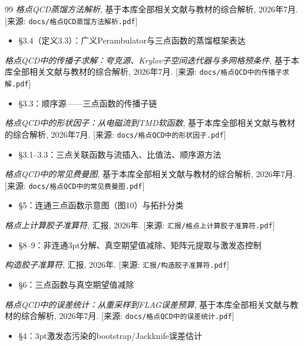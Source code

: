 \documentclass[12pt,a4paper]{ctexart}
\theoremstyle{definition}
\begin{document}
\begin{thebibliography}{99}
\textit{格点QCD蒸馏方法解析},
基于本库全部相关文献与教材的综合解析, 2026年7月.
[来源: \texttt{docs/格点QCD蒸馏方法解析.pdf}]
\begin{itemize}
    \item §3.4（定义3.3）：广义Perambulator与三点函数的蒸馏框架表达
\end{itemize}

\textit{格点QCD中的传播子求解：夸克源、Krylov子空间迭代器与多网格预条件},
基于本库全部相关文献与教材的综合解析, 2026年7月.
[来源: \texttt{docs/格点QCD中的传播子求解.pdf}]
\begin{itemize}
    \item §3.3：顺序源——三点函数的传播子链
\end{itemize}

\textit{格点QCD中的形状因子：从电磁流到TMD软函数},
基于本库全部相关文献与教材的综合解析, 2026年7月.
[来源: \texttt{docs/格点QCD中的形状因子.pdf}]
\begin{itemize}
    \item §3.1--3.3：三点关联函数与流插入、比值法、顺序源方法
\end{itemize}

\textit{格点QCD中的常见费曼图},
基于本库全部相关文献与教材的综合解析, 2026年7月.
[来源: \texttt{docs/格点QCD中的常见费曼图.pdf}]
\begin{itemize}
    \item §5：连通三点函数示意图（图10）与拓扑分类
\end{itemize}

\textit{格点上计算胶子准算符},
汇报, 2026年.
[来源: \texttt{汇报/格点上计算胶子准算符.pdf}]
\begin{itemize}
    \item §8--9：非连通3pt分解、真空期望值减除、矩阵元提取与激发态控制
\end{itemize}

\textit{构造胶子准算符},
汇报, 2026年.
[来源: \texttt{汇报/构造胶子准算符.pdf}]
\begin{itemize}
    \item §6：三点函数与真空期望值减除
\end{itemize}

\textit{格点QCD中的误差统计：从重采样到FLAG误差预算},
基于本库全部相关文献与教材的综合解析, 2026年7月.
[来源: \texttt{docs/格点QCD中的误差统计.pdf}]
\begin{itemize}
    \item §4：3pt激发态污染的bootstrap/Jackknife误差估计
\end{itemize}


\end{thebibliography}
\end{document}
